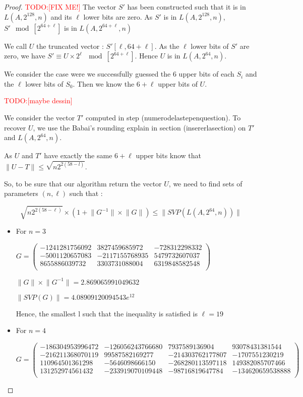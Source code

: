 \documentclass[preprint,svgnames]{iacrtrans}
\newcommand{\todo}[1]{\textcolor{red}{TODO:[#1]}}
\begin{document}
\begin{proof} \todo{FIX ME!}
The vector \(S'\) has been constructed such that it is in \(L(A,2^{128},n)\) and its \(\ell\) lower bits are zero. As \(S'\) is in \(L(A,2^{128},n)\), \(S' \mod [2^{64+\ell}]\) is in \(L(A,2^{64+\ell},n)\)

We call \(U\) the truncated vector : \(S'[\ell,64+\ell]\). As the \(\ell\) lower bits of \(S'\) are zero, we have \(S' \equiv U \times 2^\ell\ \mod [2^{64+\ell}]\). Hence \(U\) is in \(L(A,2^{64},n)\).

We consider the case were we successfully guessed the 6 upper bits of each \(S_i\) and the \(\ell\) lower bits of \(S_0\). Then we know the \(6+\ell\) upper bits of \(U\).

\todo{maybe dessin}


We consider the vector \(T'\) computed in step (numerodelastepenquestion). To recover \(U\), we use the Babai's rounding explain in section (insererlasection) on \(T'\) and \(L(A,2^{64},n)\).

As \(U\) and \(T'\) have exactly the same \(6+\ell\) upper bits  know that \(\lVert U-T \rVert \leqslant \sqrt{n2^{2(58-l)}}\).

So, to be sure that our algorithm return the vector \(U\), we need to find sets of parameters \((n,\ell)\) such that :	 

\[\sqrt{n2^{2(58-\ell)}} \times (1 +\lVert G^{-1} \rVert  \times \lVert G\rVert) \leqslant \lVert SVP(L(A,2^{64},n))\rVert \]

\begin{itemize}
	\item For \(n=3\)
	
	\(G = \begin{pmatrix}
	-1241281756092&3827459685972&-728312298332\\
	-5001120657083&-2117155768935&5479732607037\\
	8655886039732&3303731088004&6319848582548\\
	\end{pmatrix}\)
	
	\(\lVert G \rVert \times \lVert G^{-1} \rVert = 2.869065991049632\)
	
	\(\lVert SVP(G) \rVert = 4.08909120094543e{^12}\)
	
	Hence, the smallest l such that the inequality is satisfied is \(\ell = 19\) %
	
	\item For \(n=4\)
	
	\(G = \begin{pmatrix}
	-186304953996472&-126056243766680&7937589136904&93078431381544\\
	-216211368070119&99587582169277&-214303762177807&-1707551230219\\
	110964501361298&-5646098666150&-268280113597118&149382085707466\\
	131252974561432&-233919070109448&-98716819647784&-134620659538888\\
	\end{pmatrix}\)
	

\end{itemize}
\end{proof}
\end{document}
